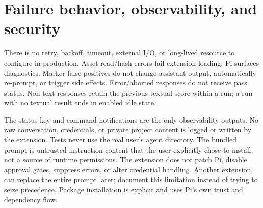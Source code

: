 \documentclass[10pt]{ltjsarticle}
\begin{document}
\section{Failure behavior, observability, and security}
There is no retry, backoff, timeout, external I/O, or long-lived resource to
configure in production. Asset read/hash errors fail extension loading; Pi
surfaces diagnostics. Marker false positives do not change assistant output,
automatically re-prompt, or trigger side effects. Error/aborted responses do
not receive pass status. Non-text responses retain the previous textual score
within a run; a run with no textual result ends in enabled idle state.

The status key and command notifications are the only observability outputs.
No raw conversation, credentials, or private project content is logged or
written by the extension. Tests never use the real user's agent directory.
The bundled prompt is untrusted instruction content that the user explicitly
chose to install, not a source of runtime permissions. The extension does not
patch Pi, disable approval gates, suppress errors, or alter credential handling.
Another extension can replace the entire prompt later; document this limitation
instead of trying to seize precedence. Package installation is explicit and
uses Pi's own trust and dependency flow.
\end{document}
